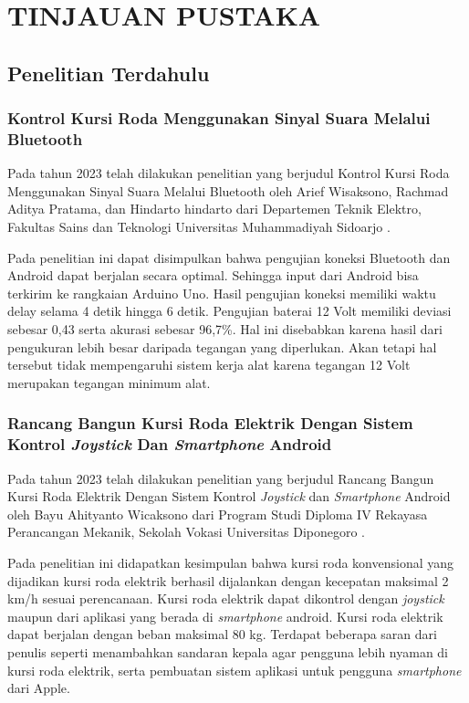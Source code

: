 \chapter{TINJAUAN PUSTAKA}
\label{chap:tinjauanpustaka}


\section{Penelitian Terdahulu}
\label{sec:penelitianterdahulu}

\subsection{Kontrol Kursi Roda Menggunakan Sinyal Suara Melalui Bluetooth}
Pada tahun 2023 telah dilakukan penelitian yang berjudul Kontrol Kursi Roda Menggunakan Sinyal Suara Melalui Bluetooth oleh Arief Wisaksono, Rachmad Aditya Pratama, dan Hindarto hindarto dari Departemen Teknik Elektro, Fakultas Sains dan Teknologi Universitas Muhammadiyah Sidoarjo \parencite{wisaksono2023kontrol}.

Pada penelitian ini dapat disimpulkan bahwa pengujian koneksi Bluetooth dan Android dapat berjalan secara optimal. Sehingga input dari Android bisa terkirim ke rangkaian Arduino Uno. Hasil pengujian koneksi memiliki waktu delay selama 4 detik hingga 6 detik. Pengujian baterai 12 Volt memiliki deviasi sebesar 0,43 serta akurasi sebesar 96,7\%. Hal ini disebabkan karena hasil dari pengukuran lebih besar daripada tegangan yang diperlukan. Akan tetapi hal tersebut tidak mempengaruhi sistem kerja alat karena tegangan 12 Volt merupakan tegangan minimum alat.

\subsection{Rancang Bangun Kursi Roda Elektrik Dengan Sistem Kontrol \emph{Joystick} Dan \emph{Smartphone} Android}
Pada tahun 2023 telah dilakukan penelitian yang berjudul Rancang Bangun Kursi Roda Elektrik Dengan Sistem Kontrol \emph{Joystick} dan \emph{Smartphone} Android oleh Bayu Ahityanto Wicaksono dari Program Studi Diploma IV Rekayasa Perancangan Mekanik, Sekolah Vokasi Universitas Diponegoro \parencite{wicaksono2023rancang}.

Pada penelitian ini didapatkan kesimpulan bahwa kursi roda konvensional yang dijadikan kursi roda elektrik berhasil dijalankan dengan kecepatan maksimal 2 km/h sesuai perencanaan. Kursi roda elektrik dapat dikontrol dengan \emph{joystick} maupun dari aplikasi yang berada di \emph{smartphone} android. Kursi roda elektrik dapat berjalan dengan beban maksimal 80 kg. Terdapat beberapa saran dari penulis seperti menambahkan sandaran kepala agar pengguna lebih nyaman di kursi roda elektrik, serta pembuatan sistem aplikasi untuk pengguna \emph{smartphone} dari Apple.

